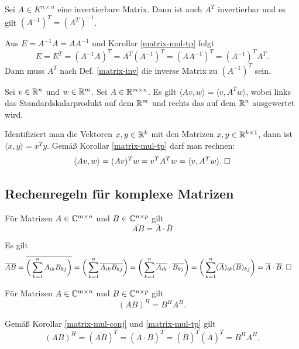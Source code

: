 \begin{Korollar}
Sei $A\in K^{n\times n}$ eine invertierbare Matrix. Dann ist auch
$A^T$ invertierbar und es gilt $(A^{-1})^T = (A^T)^{-1}$.
\end{Korollar}
\begin{Beweis}
Aus $E=A^{-1}A=AA^{-1}$ und Korollar \ref{matrix-mul-tp} folgt
\begin{equation}
E = E^T = (A^{-1}A)^T = A^T (A^{-1})^T = (AA^{-1})^T = (A^{-1})^T A^T.
\end{equation}
Dann muss $A^T$ nach Def. \ref{matrix-inv} die inverse Matrix
zu $(A^{-1})^T$ sein.\;\qedsymbol
\end{Beweis}

\newpage
\begin{Korollar}\label{Verschiebungseigenschaft}
Sei $v\in\mathbb R^n$ und $w\in\mathbb R^m$. Sei $A\in\mathbb R^{m\times n}$. Es gilt
$\langle Av,w\rangle = \langle v,A^Tw\rangle$,
wobei links das Standardskalarprodukt auf dem $\mathbb R^m$ und
rechts das auf dem $\mathbb R^n$ ausgewertet wird.
\end{Korollar}
\begin{Beweis}
Identifiziert man die Vektoren $x,y\in\mathbb R^k$ mit den
Matrizen $x,y\in\mathbb R^{k\times 1}$, dann
ist $\langle x,y\rangle = x^T y$. Gemäß Korollar
\ref{matrix-mul-tp} darf man rechnen:
\[\langle Av,w\rangle
= (Av)^T w = v^T A^T w = \langle v,A^Tw\rangle.\;\square\]
\end{Beweis}

\subsection{Rechenregeln für komplexe Matrizen}
\begin{Korollar}\label{matrix-mul-conj}
Für Matrizen $A\in\mathbb C^{m\times n}$ und $B\in\mathbb C^{n\times p}$ gilt
\[\overline{AB} = \overline A\cdot\overline B\]
\end{Korollar}
\begin{Beweis}
Es gilt
\begin{align*}
\overline{AB}
&= \overline{\bigg(\sum_{k=1}^n A_{ik}B_{kj}\bigg)}
= \bigg(\sum_{k=1}^n \overline{A_{ik}B_{kj}}\bigg)
= \bigg(\sum_{k=1}^n \overline{A_{ik}}\cdot\overline{B_{kj}}\bigg)
= \bigg(\sum_{k=1}^n (\overline A)_{ik}(\overline B)_{kj}\bigg)
= \overline A\cdot\overline B.\;\square
\end{align*}
\end{Beweis}

\begin{Korollar}\label{matrix-mul-tp-conj}
Für Matrizen $A\in\mathbb C^{m\times n}$ und $B\in\mathbb C^{n\times p}$ gilt
\[(AB)^H = B^H A^H.\]
\end{Korollar}
\begin{Beweis}
Gemäß Korollar \ref{matrix-mul-conj} und \ref{matrix-mul-tp} gilt
\[(AB)^H = (\overline{AB})^T = (\overline A\cdot\overline B)^T
= (\overline B)^T(\overline A)^T = B^H A^H.\]
\end{Beweis}

